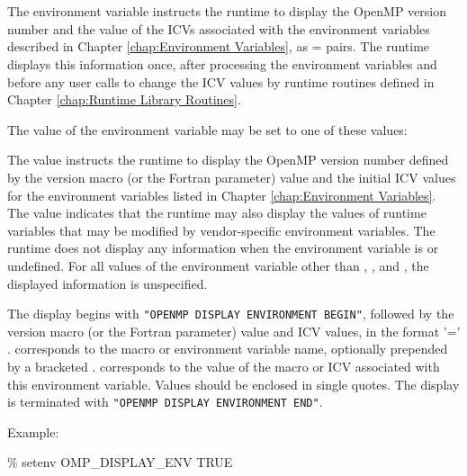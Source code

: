 \section{}
\label{sec:OMP_DISPLAY_ENV}
The  environment variable instructs the runtime to display the 
OpenMP version number and the value of the ICVs associated with the environment 
variables described in Chapter \ref{chap:Environment Variables}, 
as  =  pairs. The runtime displays this 
information once, after processing the environment variables and before any user calls 
to change the ICV values by runtime routines defined in Chapter \ref{chap:Runtime Library Routines}.

The value of the  environment variable may be set to one of these 
values:


The  value instructs the runtime to display the OpenMP version number defined by 
the  version macro (or the  Fortran parameter) value and 
the initial ICV values for the environment variables listed in 
Chapter \ref{chap:Environment Variables}. The  
value indicates that the runtime may also display the values 
of runtime variables that may be modified by vendor-specific 
environment variables. The runtime does not display any information 
when the  environment variable is 
 or undefined. For all values of the environment
variable other than , , and , 
the displayed information is unspecified.

The display begins with \texttt{"OPENMP DISPLAY ENVIRONMENT BEGIN"}, followed by 
the  version macro (or the  Fortran parameter) value and 
ICV values, in the format  '=' .  corresponds to the macro or 
environment variable name, optionally prepended by a bracketed .  
corresponds to the value of the macro or ICV associated with this environment variable. 
Values should be enclosed in single quotes. The display is terminated with 
\texttt{"OPENMP DISPLAY ENVIRONMENT END"}.

Example: 
\begin{boxedcode}
\% setenv OMP\_DISPLAY\_ENV TRUE
\end{boxedcode}

